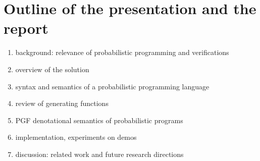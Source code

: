 \documentclass[a4paper, 8pt]{article}
\begin{document}
\section*{Outline of the presentation and the report}
\setlength{\parskip}{0pt}
\begin{enumerate}
	\item background: relevance of probabilistic programming and verifications
	\item overview of the solution
	\item syntax and semantics of a probabilistic programming language
	\item review of generating functions
	\item PGF denotational semantics of probabilistic programs
	\item implementation, experiments on demos
	\item discussion: related work and future research directions
\end{enumerate}

\printbibliography
\end{document}
